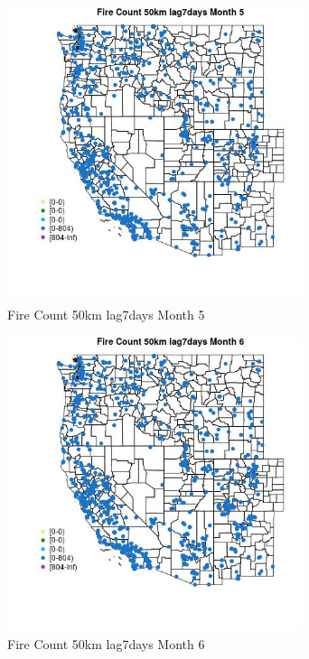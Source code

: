 \begin{figure} 
\centering  
\includegraphics[width=0.77\textwidth]{Code_Outputs/Report_ML_input_PM25_Step4_part_f_de_duplicated_aveswNAs_MapObsMo5Fire_Count_50km_lag7days.jpg} 
\caption{\label{fig:Report_ML_input_PM25_Step4_part_f_de_duplicated_aveswNAsMapObsMo5Fire_Count_50km_lag7days}Fire Count 50km lag7days Month 5} 
\end{figure} 
 

\begin{figure} 
\centering  
\includegraphics[width=0.77\textwidth]{Code_Outputs/Report_ML_input_PM25_Step4_part_f_de_duplicated_aveswNAs_MapObsMo6Fire_Count_50km_lag7days.jpg} 
\caption{\label{fig:Report_ML_input_PM25_Step4_part_f_de_duplicated_aveswNAsMapObsMo6Fire_Count_50km_lag7days}Fire Count 50km lag7days Month 6} 
\end{figure} 
 

